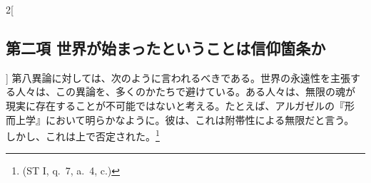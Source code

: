 \documentclass[paper=a4paper,fontsize=10pt,jafontsize=9pt,titlepage]{jlreq}
\begin{document}
\begin{paracol}{2}[\subsection{第二項 世界が始まったということは信仰箇条か}]
第八異論に対しては、次のように言われるべきである。世界の永遠性を主張す
る人々は、この異論を、多くのかたちで避けている。ある人々は、無限の魂が
現実に存在することが不可能ではないと考える。たとえば、アルガゼルの『形
而上学』において明らかなように。彼は、これは附帯性による無限だと言う。
しかし、これは上で否定された。\footnote{(ST I, q.~7, a.~4, c.)}

\end{paracol}
\end{document}
